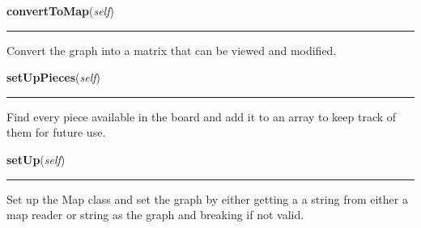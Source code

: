     \label{UnBlockMe:Map:Map:Map:convertToMap}

    \vspace{0.5ex}

\hspace{.8\funcindent}\begin{boxedminipage}{\funcwidth}

    \raggedright \textbf{convertToMap}(\textit{self})

    \vspace{-1.5ex}

    \rule{\textwidth}{0.5\fboxrule}
\setlength{\parskip}{2ex}
    Convert the graph into a matrix that can be viewed and modified.

\setlength{\parskip}{1ex}
    \end{boxedminipage}

    \label{UnBlockMe:Map:Map:Map:setUpPieces}

    \vspace{0.5ex}

\hspace{.8\funcindent}\begin{boxedminipage}{\funcwidth}

    \raggedright \textbf{setUpPieces}(\textit{self})

    \vspace{-1.5ex}

    \rule{\textwidth}{0.5\fboxrule}
\setlength{\parskip}{2ex}
    Find every piece available in the board and add it to an array to keep 
    track of them for future use.

\setlength{\parskip}{1ex}
    \end{boxedminipage}

    \label{UnBlockMe:Map:Map:Map:setUp}

    \vspace{0.5ex}

\hspace{.8\funcindent}\begin{boxedminipage}{\funcwidth}

    \raggedright \textbf{setUp}(\textit{self})

    \vspace{-1.5ex}

    \rule{\textwidth}{0.5\fboxrule}
\setlength{\parskip}{2ex}
    Set up the Map class and set the graph by either getting a a string 
    from either a map reader or string as the graph and breaking if not 
    valid.

\setlength{\parskip}{1ex}
    \end{boxedminipage}

